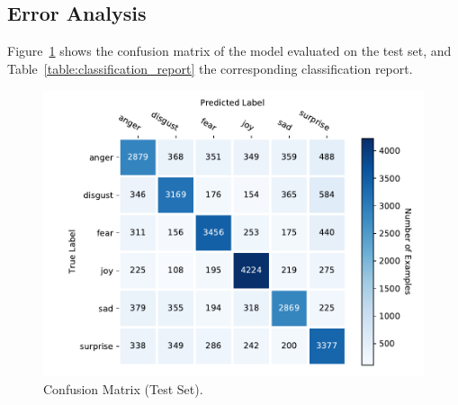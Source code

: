 \documentclass[11pt,a4paper]{article}
\begin{document}
\subsection{Error Analysis}

Figure~\ref{fig:confusion_matrix} shows the confusion matrix of the model
evaluated on the test set, and Table~\ref{table:classification_report} the
corresponding classification report.

\begin{figure}[!h]
    \centering
    \includegraphics[width=\columnwidth]{images/confusion_matrix.pdf}

    \caption{Confusion Matrix (Test Set).}


    \label{fig:confusion_matrix}
\end{figure}
\end{document}
